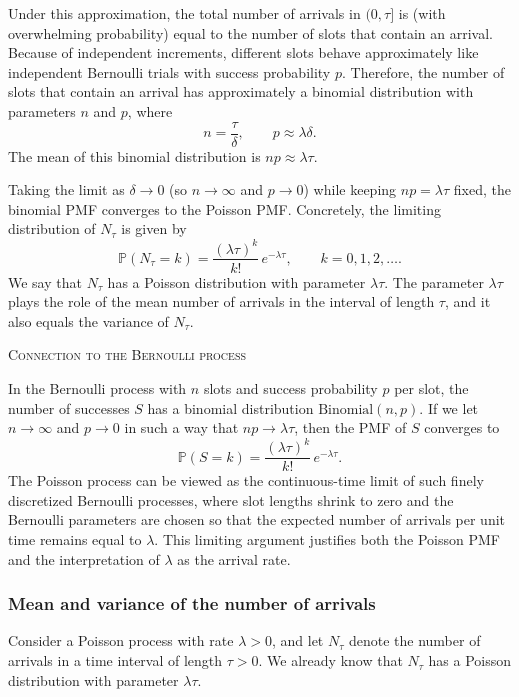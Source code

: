 Under this approximation, the total number of arrivals in \((0,\tau]\) is (with overwhelming probability) equal to the number of slots that contain an arrival.  
Because of independent increments, different slots behave approximately like independent Bernoulli trials with success probability \(p\).  
Therefore, the number of slots that contain an arrival has approximately a binomial distribution with parameters \(n\) and \(p\), where
\[
n = \frac{\tau}{\delta},
\qquad
p \approx \lambda \delta.
\]
The mean of this binomial distribution is \(np \approx \lambda \tau\).  

Taking the limit as \(\delta \to 0\) (so \(n \to \infty\) and \(p \to 0\)) while keeping \(np = \lambda \tau\) fixed, the binomial PMF converges to the Poisson PMF.  
Concretely, the limiting distribution of \(N_\tau\) is given by
\[
\mathbb{P}(N_\tau = k)
=
\frac{(\lambda \tau)^k}{k!}\,e^{-\lambda \tau},
\qquad
k = 0,1,2,\dots.
\]
We say that \(N_\tau\) has a Poisson distribution with parameter \(\lambda \tau\).  
The parameter \(\lambda \tau\) plays the role of the mean number of arrivals in the interval of length \(\tau\), and it also equals the variance of \(N_\tau\).  

\bigskip
\textsc{Connection to the Bernoulli process}

In the Bernoulli process with \(n\) slots and success probability \(p\) per slot, the number of successes \(S\) has a binomial distribution \(\text{Binomial}(n,p)\).  
If we let \(n \to \infty\) and \(p \to 0\) in such a way that \(np \to \lambda \tau\), then the PMF of \(S\) converges to
\[
\mathbb{P}(S = k)
=
\frac{(\lambda \tau)^k}{k!}\,e^{-\lambda \tau}.
\]
The Poisson process can be viewed as the continuous-time limit of such finely discretized Bernoulli processes, where slot lengths shrink to zero and the Bernoulli parameters are chosen so that the expected number of arrivals per unit time remains equal to \(\lambda\).  
This limiting argument justifies both the Poisson PMF and the interpretation of \(\lambda\) as the arrival rate.


\subsubsection{Mean and variance of the number of arrivals}

Consider a Poisson process with rate \(\lambda > 0\), and let \(N_\tau\) denote the number of arrivals in a time interval of length \(\tau > 0\).  
We already know that \(N_\tau\) has a Poisson distribution with parameter \(\lambda \tau\).  

